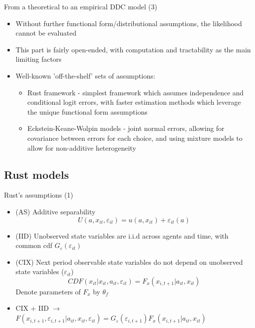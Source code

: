 \documentclass[aspectratio=169]{beamer}
\begin{document}
	\begin{frame}{From a theoretical to an empirical DDC model (3)}
		\begin{itemize}[<+->]
			\itemsep1em
			\item Without further functional form/distributional assumptions, the likelihood cannot be evaluated
			\item This part is fairly open-ended, with computation and tractability as the main limiting factors
			\item Well-known 'off-the-shelf' sets of assumptions:
			\begin{itemize}
				\item Rust framework - simplest framework which assumes independence and conditional logit errors, with faster estimation methods which leverage the unique functional form assumptions
				\item Eckstein-Keane-Wolpin models - joint normal errors, allowing for covariance between errors for each choice, and using mixture models to allow for non-additive heterogeneity
			\end{itemize}
		\end{itemize}
	\end{frame}
	
	\subsection{Rust models}
	
	\begin{frame}{Rust's assumptions (1)}
		\begin{itemize}
			\itemsep1em
			\item (AS) Additive separability
			\begin{equation*}
				U(a,x_{it},\varepsilon_{it}) = u(a,x_{it}) + \varepsilon_{it}(a)
			\end{equation*}
			\item (IID) Unobserved state variables are i.i.d across agents and time, with common cdf $G_\varepsilon(\varepsilon_{it})$
			\item (CIX) Next period observable state variables do not depend on unobserved state variables ($\varepsilon_{it}$)
			$$CDF(x_{it}|x_{it},a_{it},\varepsilon_{it}) = F_x(x_{i,t+1}|a_{it},x_{it})$$
			Denote parameters of $F_x$ by $\theta_f$
			\item CIX + IID $\rightarrow$ $F(x_{i,t+1},\varepsilon_{i,t+1}|a_{it},x_{it},\varepsilon_{it}) = G_\varepsilon(\varepsilon_{i,t+1}) F_x(x_{i,t+1}|a_{it},x_{it})$
		\end{itemize}
	\end{frame}
	
\end{document}
